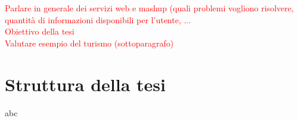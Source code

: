 \textcolor{red}{Parlare in generale dei servizi web e mashup (quali problemi vogliono risolvere, quantit\`a di informazioni disponibili per l'utente, ...\\
Obiettivo della tesi\\
Valutare esempio del turismo (sottoparagrafo)} \cite{DBLP:journals/debu/BolchiniOQST11}

\section{Struttura della tesi\label{sec:struttura-tesi}}

abc
